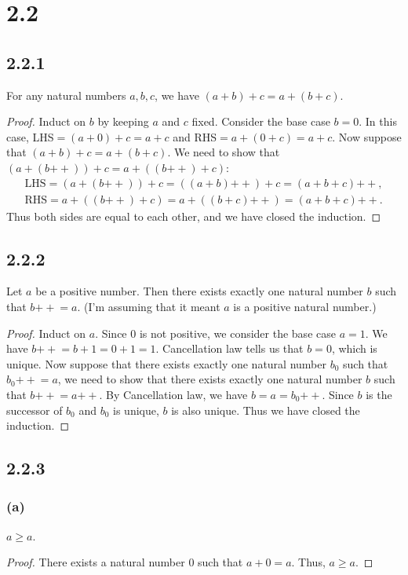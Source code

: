 \documentclass[12pt, letter]{article}
\begin{document}
\section*{2.2}
\subsection*{2.2.1}
For any natural numbers $a, b, c$, we have $(a+b)+c=a+(b+c)$.
\begin{proof}
    Induct on $b$ by keeping $a$ and $c$ fixed. Consider the base case $b=0$. In this case, LHS$=(a+0)+c=a+c$ and RHS$=a+(0+c)=a+c$. Now suppose that 
    $(a+b)+c=a+(b+c)$. We need to show that $(a+(b\mathtt{++}))+c=a+((b\mathtt{++})+c)$: 
    \begin{equation*}
        \begin{aligned}
            \text{LHS}=(a+(b\mathtt{++}))+c=((a+b)\mathtt{++})+c=(a+b+c)\mathtt{++},\\
            \text{RHS}=a+((b\mathtt{++})+c)=a+((b+c)\mathtt{++})=(a+b+c)\mathtt{++}.
        \end{aligned}
    \end{equation*}
    Thus both sides are equal to each other, and we have closed the induction.
\end{proof}

\subsection*{2.2.2}
Let $a$ be a positive number. Then there exists exactly one natural number $b$ such that $b\mathtt{++}=a$. (I'm assuming that it meant $a$ is a positive natural number.)
\begin{proof}
    Induct on $a$. Since $0$ is not positive, we consider the base case $a=1$. We have $b\mathtt{++}=b+1=0+1=1$. Cancellation law tells us that $b=0$, which is unique. Now suppose that there exists exactly one natural number $b_0$ such that $b_0\mathtt{++}=a$, we need to show that
    there exists exactly one natural number $b$ such that $b\mathtt{++}=a\mathtt{++}$. By Cancellation law, we have $b=a=b_0\mathtt{++}$. Since $b$ is the successor of $b_0$ and $b_0$ is unique, $b$ is also unique. Thus we have closed the induction.
\end{proof}

\subsection*{2.2.3}
\subsubsection*{(a)}
$a\geq a$.
\begin{proof}
    There exists a natural number $0$ such that $a+0=a$. Thus, $a\geq a$.
\end{proof}
\end{document}

